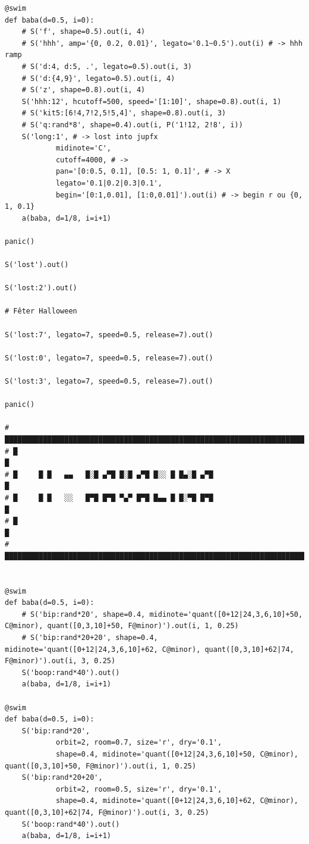 \documentclass[11pt]{article}
\begin{document}
\begin{enumerate}
\begin{verbatim}
@swim
def baba(d=0.5, i=0):
    # S('f', shape=0.5).out(i, 4)
    # S('hhh', amp='{0, 0.2, 0.01}', legato='0.1~0.5').out(i) # -> hhh ramp
    # S('d:4, d:5, .', legato=0.5).out(i, 3)
    # S('d:{4,9}', legato=0.5).out(i, 4)
    # S('z', shape=0.8).out(i, 4)
    S('hhh:12', hcutoff=500, speed='[1:10]', shape=0.8).out(i, 1)
    # S('kit5:[6!4,7!2,5!5,4]', shape=0.8).out(i, 3)
    # S('q:rand*8', shape=0.4).out(i, P('1!12, 2!8', i))
    S('long:1', # -> lost into jupfx
            midinote='C',
            cutoff=4000, # ->
            pan='[0:0.5, 0.1], [0.5: 1, 0.1]', # -> X
            legato='0.1|0.2|0.3|0.1',
            begin='[0:1,0.01], [1:0,0.01]').out(i) # -> begin r ou {0, 1, 0.1}
    a(baba, d=1/8, i=i+1)

panic()

S('lost').out()

S('lost:2').out()

# Fêter Halloween

S('lost:7', legato=7, speed=0.5, release=7).out()

S('lost:0', legato=7, speed=0.5, release=7).out()

S('lost:3', legato=7, speed=0.5, release=7).out()

panic()

# ██████████████████████████████████████████████████████████████████████████████
# █                                                                            █
# █     █ █   ▄▄   █░█ ▄▀█ █░█ ▄▀█ █░░ █ █▄░█ ▄▀█                              █
# █     █ █   ░░   █▀█ █▀█ ▀▄▀ █▀█ █▄▄ █ █░▀█ █▀█                              █
# █                                                                            █
# ██████████████████████████████████████████████████████████████████████████████


@swim
def baba(d=0.5, i=0):
    # S('bip:rand*20', shape=0.4, midinote='quant([0+12|24,3,6,10]+50, C@minor), quant([0,3,10]+50, F@minor)').out(i, 1, 0.25)
    # S('bip:rand*20+20', shape=0.4, midinote='quant([0+12|24,3,6,10]+62, C@minor), quant([0,3,10]+62|74, F@minor)').out(i, 3, 0.25)
    S('boop:rand*40').out()
    a(baba, d=1/8, i=i+1)

@swim
def baba(d=0.5, i=0):
    S('bip:rand*20',
            orbit=2, room=0.7, size='r', dry='0.1',
            shape=0.4, midinote='quant([0+12|24,3,6,10]+50, C@minor), quant([0,3,10]+50, F@minor)').out(i, 1, 0.25)
    S('bip:rand*20+20',
            orbit=2, room=0.5, size='r', dry='0.1',
            shape=0.4, midinote='quant([0+12|24,3,6,10]+62, C@minor), quant([0,3,10]+62|74, F@minor)').out(i, 3, 0.25)
    S('boop:rand*40').out()
    a(baba, d=1/8, i=i+1)


\end{verbatim}
\end{enumerate}
\end{document}
